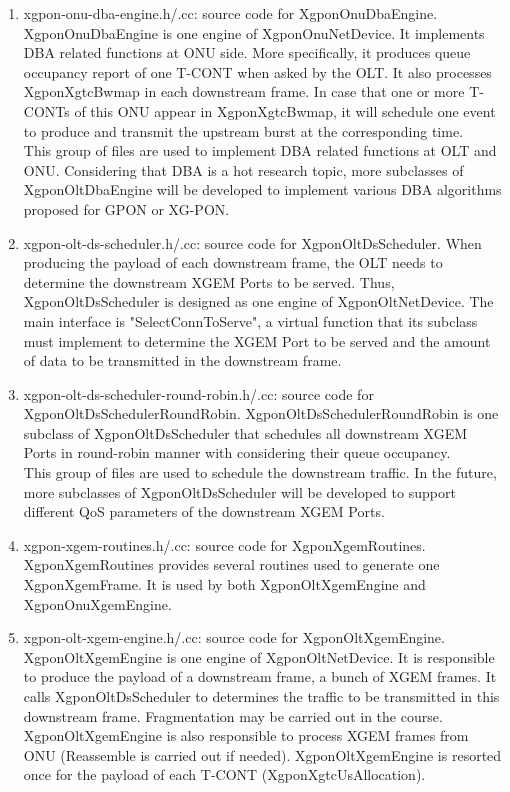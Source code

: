 \begin{enumerate}
 \item xgpon-onu-dba-engine.h/.cc: source code for {\color{red} XgponOnuDbaEngine}. XgponOnuDbaEngine is one engine 
of XgponOnuNetDevice. It implements DBA related functions at ONU side. More specifically, it produces queue occupancy 
report of one T-CONT when asked by the OLT. It also processes XgponXgtcBwmap in each downstream frame. 
In case that one or more T-CONTs of this ONU appear in XgponXgtcBwmap, it will schedule one event to produce 
and transmit the upstream burst at the corresponding time.
\\
{\color{blue} This group of files are used to implement DBA related functions at OLT and ONU. 
Considering that DBA is a hot research topic, more subclasses of XgponOltDbaEngine will be developed to 
implement various DBA algorithms proposed for GPON or XG-PON.}
\vspace{0.3in}


 \item xgpon-olt-ds-scheduler.h/.cc: source code for {\color{red} XgponOltDsScheduler}. When producing the payload 
of each downstream frame, the OLT needs to determine the downstream XGEM Ports to be served. Thus, XgponOltDsScheduler 
is designed as one engine of XgponOltNetDevice. The main interface is "SelectConnToServe", a virtual function 
that its subclass must implement to determine the XGEM Port to be served and the amount of data to be transmitted 
in the downstream frame.

 \item xgpon-olt-ds-scheduler-round-robin.h/.cc: source code for {\color{red} XgponOltDsSchedulerRoundRobin}. 
XgponOltDsSchedulerRoundRobin is one subclass of XgponOltDsScheduler that schedules all downstream XGEM Ports 
in round-robin manner with considering their queue occupancy.
\\
{\color{blue} This group of files are used to schedule the downstream traffic. In the future, more subclasses of 
XgponOltDsScheduler will be developed to support different QoS parameters of the downstream XGEM Ports.}
\vspace{0.3in}


 \item xgpon-xgem-routines.h/.cc: source code for {\color{red} XgponXgemRoutines}. XgponXgemRoutines provides 
several routines used to generate one XgponXgemFrame. It is used by both XgponOltXgemEngine and XgponOnuXgemEngine.

 \item xgpon-olt-xgem-engine.h/.cc: source code for {\color{red} XgponOltXgemEngine}. XgponOltXgemEngine 
is one engine of XgponOltNetDevice. It is responsible to produce the payload of a downstream frame, 
a bunch of XGEM frames. It calls XgponOltDsScheduler to determines the traffic to be transmitted in this downstream frame. 
Fragmentation may be carried out in the course. XgponOltXgemEngine is also responsible to process XGEM frames from ONU 
(Reassemble is carried out if needed). XgponOltXgemEngine is resorted once for the payload of each T-CONT (XgponXgtcUsAllocation).


\end{enumerate}
